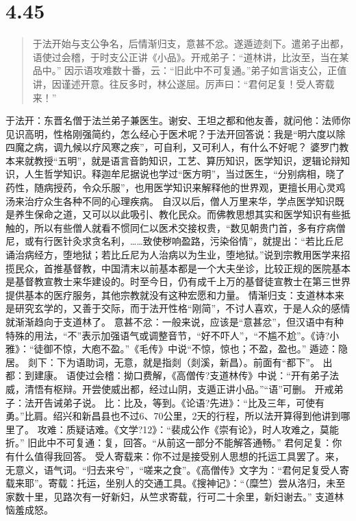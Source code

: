 \documentclass[]{book}
\begin{document}
\section{4.45}\label{section-223}

\begin{quote}
于法开始与支公争名，后情渐归支，意甚不忿。遂遁迹剡下。遣弟子出都，语使过会稽，于时支公正讲《小品》。开戒弟子：``道林讲，比汝至，当在某品中。''
因示语攻难数十番，云：``旧此中不可复通。''弟子如言诣支公，正值讲，因谨述开意。往反多时，林公遂屈。厉声曰：``君何足复！受人寄载来！''
\end{quote}

于法开：东晋名僧于法兰弟子兼医生。谢安、王坦之都和他友善，就问他：法师你见识高明，性格刚强简约，怎么经心于医术呢？于法开回答说：我是``明六度以除四魔之病，调九候以疗风寒之疾''，可自利，又可利人，有什么不好呢？
婆罗门教本来就教授``五明''，就是语言音韵知识，工艺、算历知识，医学知识，逻辑论辩知识，人生哲学知识。释迦牟尼据说也学过``医方明''，当过医生，``分别病相，晓了药性，随病授药，令众乐服''，也用医学知识来解释他的世界观，更擅长用心灵鸡汤来治疗众生各种不同的心理疾病。
自汉以后，僧人万里来华，学点医学知识既是养生保命之道，又可以以此吸引、教化民众。而佛教思想其实和医学知识有些抵触的，所以有些僧人就看不惯同仁以医术交接权贵，``数见朝贵门首，多有疗病僧尼，或有行医针灸求贪名利，\ldots{}\ldots{}致使秽响盈路，污染俗情''，就提出：``若比丘尼诵治病经方，堕地狱；若比丘尼为人治病以为生业，堕地狱。''说到宗教用医学来招揽民众，首推基督教，中国清末以前基本都是一个大夫坐诊，比较正规的医院基本是基督教宣教士来华建设的。时至今日，仍有成千上万的基督徒宣教士在第三世界提供基本的医疗服务，其他宗教就没有这种宏愿和力量。
情渐归支：支道林本来是研究玄学的，又善于交际，而于法开性格``刚简''，不讨人喜欢，于是人众的感情就渐渐趋向于支道林了。
意甚不忿：一般来说，应该是``意甚忿''，但汉语中有种特殊的用法，``不''表示加强语气或调整音节，``好不吓人''，``不尴不尬''。《诗?小雅》：``徒御不惊，大庖不盈。''《毛传》中说``不惊，惊也；不盈，盈也。''
遁迹：隐居。
剡下：下为语助词，无意，就是指剡（剡溪，新昌）。前面有``都下''。
出都：到建康。
语使过会稽：拗口费解，《高僧传?支道林传》中说：``开有弟子法威，清悟有枢辩。开尝使威出都，经过山阴，支遁正讲小品。''``语''可删。
开戒弟子：法开告诫弟子说。
比：比及，等到。《论语?先进》：``比及三年，可使有勇。''比肩。绍兴和新昌县也不过6、70公里，2天的行程，所以法开算得到他讲到哪里了。
攻难：质疑诘难。《文学?12》：``裴成公作《崇有论》，时人攻难之，莫能折。''
旧此中不可复通：复，回答。``从前这一部分不能解答通畅。''
君何足复：你有什么值得我回答。
受人寄载来：你不过是接受别人思想的托运工具罢了。来，无意义，语气词。``归去来兮''，``嗟来之食''。《高僧传》文字为：``君何足复受人寄载来耶''。寄载：托运，坐别人的交通工具。《搜神记》：``（糜竺）尝从洛归，未至家数十里，见路次有一好新妇，从竺求寄载，行可二十余里，新妇谢去。''
支道林恼羞成怒。
\end{document}
